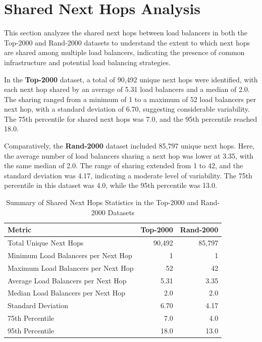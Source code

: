 \documentclass[12pt]{cwru_thesis}
\begin{document}
\newpage



\section{Shared Next Hops Analysis}

This section analyzes the shared next hops between load balancers in both the Top-2000 and Rand-2000 datasets to understand the extent to which next hops are shared among multiple load balancers, indicating the presence of common infrastructure and potential load balancing strategies.

In the \textbf{Top-2000} dataset, a total of 90,492 unique next hops were identified, with each next hop shared by an average of 5.31 load balancers and a median of 2.0. The sharing ranged from a minimum of 1 to a maximum of 52 load balancers per next hop, with a standard deviation of 6.70, suggesting considerable variability. The 75th percentile for shared next hops was 7.0, and the 95th percentile reached 18.0.

Comparatively, the \textbf{Rand-2000} dataset included 85,797 unique next hops. Here, the average number of load balancers sharing a next hop was lower at 3.35, with the same median of 2.0. The range of sharing extended from 1 to 42, and the standard deviation was 4.17, indicating a moderate level of variability. The 75th percentile in this dataset was 4.0, while the 95th percentile was 13.0.


\begin{table}[h!]
    \centering
    \begin{tabular}{|l|r|r|}
        \hline
        \textbf{Metric} & \textbf{Top-2000} & \textbf{Rand-2000} \\
        \hline
        Total Unique Next Hops & 90,492 & 85,797 \\
        Minimum Load Balancers per Next Hop & 1 & 1 \\
        Maximum Load Balancers per Next Hop & 52 & 42 \\
        Average Load Balancers per Next Hop & 5.31 & 3.35 \\
        Median Load Balancers per Next Hop & 2.0 & 2.0 \\
        Standard Deviation & 6.70 & 4.17 \\
        75th Percentile & 7.0 & 4.0 \\
        95th Percentile & 18.0 & 13.0 \\
        \hline
    \end{tabular}
    \caption{Summary of Shared Next Hops Statistics in the Top-2000 and Rand-2000 Datasets}
    \label{tab:shared_next_hops_summary}
\end{table}
\end{document}
